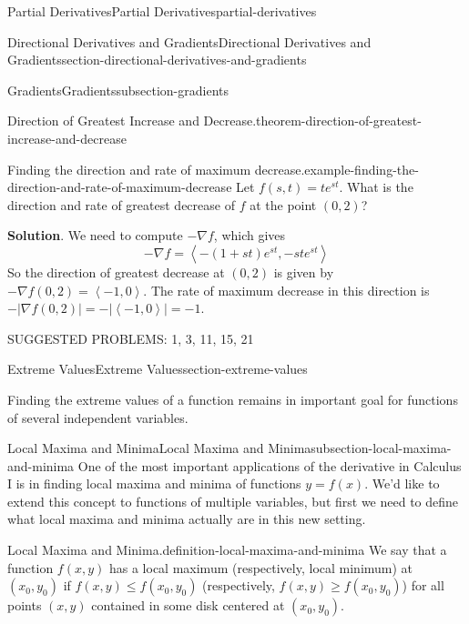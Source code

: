 \documentclass[oneside,10pt,]{book}
\numberwithin{equation}{section}
\newcommand{\grad}{\nabla}
\newcommand{\dotprod}[1]{\left\langle #1 \right\rangle}
\begin{document}
\begin{chapterptx}{Partial Derivatives}{}{Partial Derivatives}{}{}{partial-derivatives}
\begin{sectionptx}{Directional Derivatives and Gradients}{}{Directional Derivatives and Gradients}{}{}{section-directional-derivatives-and-gradients}
\begin{subsectionptx}{Gradients}{}{Gradients}{}{}{subsection-gradients}
\begin{theorem}{Direction of Greatest Increase and Decrease.}{}{theorem-direction-of-greatest-increase-and-decrease}
\end{theorem}
\begin{example}{Finding the direction and rate of maximum decrease.}{example-finding-the-direction-and-rate-of-maximum-decrease}%
\hypertarget{p-1416}{}%
Let \(f(s,t) = te^{st}\). What is the direction and rate of greatest decrease of \(f\) at the point \((0,2)\)?%
\par\smallskip%
\noindent\textbf{Solution}.\hypertarget{solution-230}{}\quad%
\hypertarget{p-1417}{}%
We need to compute \(-\grad f\), which gives%
\begin{equation*}
-\grad f = \dotprod{-(1 + st)e^{st}, -ste^{st}}
\end{equation*}
So the direction of greatest decrease at \((0,2)\) is given by \(-\grad f(0,2) = \dotprod{-1, 0}\). The rate of maximum decrease in this direction is \(-|\grad f(0,2)| = -|\dotprod{-1,0}| = -1\).%
\end{example}
\end{subsectionptx}
\hypertarget{p-1418}{}%
SUGGESTED PROBLEMS: 1, 3, 11, 15, 21%
\end{sectionptx}
%
%
\typeout{************************************************}
\typeout{************************************************}
%
\begin{sectionptx}{Extreme Values}{}{Extreme Values}{}{}{section-extreme-values}
\begin{introduction}{}%
\hypertarget{p-1419}{}%
Finding the extreme values of a function remains in important goal for functions of several independent variables.%
\end{introduction}%
%
%
\typeout{************************************************}
\typeout{************************************************}
%
\begin{subsectionptx}{Local Maxima and Minima}{}{Local Maxima and Minima}{}{}{subsection-local-maxima-and-minima}
\hypertarget{p-1420}{}%
One of the most important applications of the derivative in Calculus I is in finding local maxima and minima of functions \(y = f(x)\). We'd like to extend this concept to functions of multiple variables, but first we need to define what local maxima and minima actually are in this new setting.%
\begin{definition}{Local Maxima and Minima.}{definition-local-maxima-and-minima}%
\hypertarget{p-1421}{}%
We say that a function \(f(x,y)\) has a local maximum (respectively, local minimum) at \((x_{0},y_{0})\) if \(f(x,y)\leq f(x_{0},y_{0})\) (respectively, \(f(x,y)\geq f(x_{0},y_{0})\)) for all points \((x,y)\) contained in some disk centered at \((x_{0},y_{0})\).%

\end{definition}
\end{subsectionptx}
\end{sectionptx}
\end{chapterptx}
\end{document}
